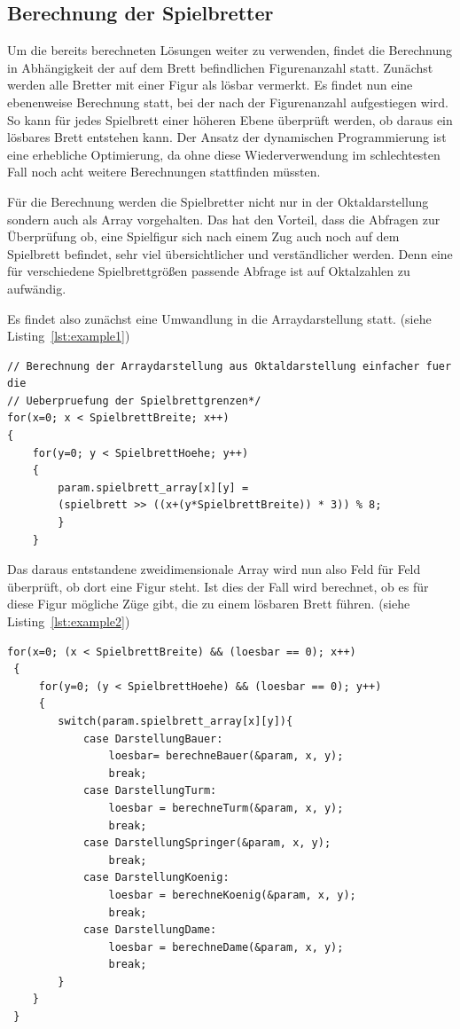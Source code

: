 \documentclass[
	12pt,
	a4paper,
	BCOR10mm,
	DIV14,
	listof=totoc,
	bibliography=totoc,
	headsepline
]{scrreprt}
\begin{document}
\subsection{Berechnung der Spielbretter}
Um die bereits berechneten Lösungen weiter zu verwenden, findet die Berechnung in Abhängigkeit der auf dem Brett befindlichen Figurenanzahl statt.
Zunächst werden alle Bretter mit einer Figur als lösbar vermerkt.
Es findet nun eine ebenenweise Berechnung statt, bei der nach der Figurenanzahl aufgestiegen wird. So kann für jedes Spielbrett einer höheren Ebene überprüft werden, ob daraus ein lösbares Brett entstehen kann. Der Ansatz der dynamischen Programmierung ist eine erhebliche Optimierung, da ohne diese Wiederverwendung im schlechtesten Fall noch acht weitere Berechnungen stattfinden müssten. 

Für die Berechnung werden die Spielbretter nicht nur in der Oktaldarstellung sondern auch als Array vorgehalten. 
Das hat den Vorteil, dass die Abfragen zur Überprüfung ob, eine Spielfigur sich nach einem Zug auch noch auf dem Spielbrett befindet, sehr viel übersichtlicher und verständlicher werden. 
Denn eine für verschiedene Spielbrettgrößen passende Abfrage ist auf Oktalzahlen zu aufwändig.

Es findet also zunächst eine Umwandlung in die Arraydarstellung statt.
(siehe Listing~\ref{lst:example1})
\begin{lstlisting}[caption={Umwandlung in Arraydarstellung}, label={lst:example1}]  
// Berechnung der Arraydarstellung aus Oktaldarstellung einfacher fuer die 
// Ueberpruefung der Spielbrettgrenzen*/
for(x=0; x < SpielbrettBreite; x++)
{
    for(y=0; y < SpielbrettHoehe; y++)
    {   
		param.spielbrett_array[x][y] = 
		(spielbrett >> ((x+(y*SpielbrettBreite)) * 3)) % 8;
        }
    }
\end{lstlisting}

Das daraus entstandene zweidimensionale Array wird nun also Feld für Feld überprüft, ob dort eine Figur steht. Ist dies der Fall wird berechnet, ob es für diese Figur mögliche Züge gibt, die zu einem lösbaren Brett führen.
(siehe Listing~\ref{lst:example2})

\newpage

\begin{lstlisting}[caption={Berechnung eines Spielbrettes}, label={lst:example2}]
 for(x=0; (x < SpielbrettBreite) && (loesbar == 0); x++)
 {
     for(y=0; (y < SpielbrettHoehe) && (loesbar == 0); y++)
	 {   
		switch(param.spielbrett_array[x][y]){
			case DarstellungBauer:
				loesbar= berechneBauer(&param, x, y);
				break;
			case DarstellungTurm:
				loesbar = berechneTurm(&param, x, y);
				break;
			case DarstellungSpringer(&param, x, y);
				break;
			case DarstellungKoenig:
				loesbar = berechneKoenig(&param, x, y);
				break;
			case DarstellungDame:
				loesbar = berechneDame(&param, x, y);
				break;
		}
	}
 }
\end{lstlisting}
\end{document}
